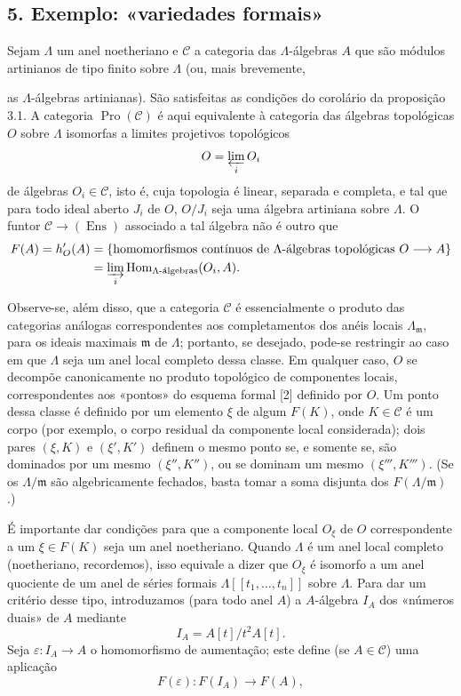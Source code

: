 \subsection*{5. Exemplo: «variedades formais»}

Sejam $\Lambda$ um anel noetheriano e $\mathcal C$ a categoria das
$\Lambda$-álgebras $A$ que são módulos artinianos de tipo finito sobre
$\Lambda$ (ou, mais brevemente,

as $\Lambda$-álgebras artinianas). São satisfeitas as condições do corolário da
proposição 3.1. A categoria $\operatorname{Pro}(\mathcal C)$ é aqui
equivalente à categoria das álgebras topológicas $O$ sobre $\Lambda$
isomorfas a limites projetivos topológicos
\[
  O=\varprojlim_i O_i
\]
de álgebras $O_i\in\mathcal C$, isto é, cuja topologia é linear, separada e
completa, e tal que para todo ideal aberto $J_i$ de $O$, $O/J_i$ seja uma
álgebra artiniana sobre $\Lambda$. O funtor
$\mathcal C\longrightarrow(\operatorname{Ens})$ associado a tal álgebra não é
outro que
\begin{align*}
  F(A)=h'_O(A)
  &=\{\text{homomorfismos contínuos de $\Lambda$-álgebras topológicas }
       O\longrightarrow A\}\\
  &=\varinjlim_i
    \operatorname{Hom}_{\Lambda\text{-álgebras}}(O_i,A).
\end{align*}

Observe-se, além disso, que a categoria $\mathcal C$ é essencialmente o produto
das categorias análogas correspondentes aos completamentos dos
anéis locais $\Lambda_{\mathfrak m}$, para os ideais maximais
$\mathfrak m$ de $\Lambda$; portanto, se desejado, pode-se restringir ao caso
em que $\Lambda$ seja um anel local completo dessa classe. Em qualquer caso,
$O$ se decompõe canonicamente no produto topológico de componentes
locais, correspondentes aos «pontos» do esquema formal [2] definido por
$O$. Um ponto dessa classe é definido por um elemento $\xi$ de algum
$F(K)$, onde $K\in\mathcal C$ é um corpo (por exemplo, o corpo residual
da componente local considerada); dois pares $(\xi,K)$ e $(\xi',K')$
definem o mesmo ponto se, e somente se, são dominados por um mesmo
$(\xi'',K'')$, ou se dominam um mesmo $(\xi''',K''')$. (Se os
$\Lambda/\mathfrak m$ são algebricamente fechados, basta tomar a soma
disjunta dos $F(\Lambda/\mathfrak m)$.)

É importante dar condições para que a componente local $O_\xi$ de $O$
correspondente a um $\xi\in F(K)$ seja um anel noetheriano. Quando $\Lambda$
é um anel local completo (noetheriano, recordemos), isso equivale a dizer
que $O_\xi$ é isomorfo a um anel quociente de um anel de séries formais
$\Lambda[[t_1,\ldots,t_n]]$ sobre $\Lambda$. Para dar um critério desse tipo,
introduzamos (para todo anel $A$) a $A$-álgebra $I_A$ dos «números
duais» de $A$ mediante
\[
  I_A=A[t]/t^2A[t].
\]
Seja $\varepsilon:I_A\longrightarrow A$ o homomorfismo de aumentação; este define
(se $A\in\mathcal C$) uma aplicação
\[
  F(\varepsilon):F(I_A)\longrightarrow F(A),
\]


